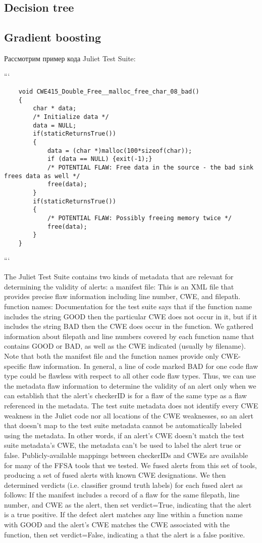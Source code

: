 \subsection{Decision tree}
\subsection{Gradient boosting}

Рассмотрим пример кода Juliet Test Suite:

```
\begin{verbatim}
    void CWE415_Double_Free__malloc_free_char_08_bad()
    {
        char * data;
        /* Initialize data */
        data = NULL;
        if(staticReturnsTrue())
        {
            data = (char *)malloc(100*sizeof(char));
            if (data == NULL) {exit(-1);}
            /* POTENTIAL FLAW: Free data in the source - the bad sink frees data as well */
            free(data);
        }
        if(staticReturnsTrue())
        {
            /* POTENTIAL FLAW: Possibly freeing memory twice */
            free(data);
        }
    }
\end{verbatim}
```


The Juliet Test Suite contains two kinds of metadata that
are relevant for determining the validity of alerts:
a manifest file: This is an XML file that provides precise
flaw information including line number, CWE, and
filepath.
function names: Documentation for the test suite says
that if the function name includes the string GOOD then
the particular CWE does not occur in it, but if it includes
the string BAD then the CWE does occur in the function.
We gathered information about filepath and line numbers
covered by each function name that contains GOOD or
BAD, as well as the CWE indicated (usually by filename).
Note that both the manifest file and the function names
provide only CWE-specific flaw information. In general, a line
of code marked BAD for one code flaw type could be flawless
with respect to all other code flaw types. Thus, we can use the
metadata flaw information to determine the validity of an alert
only when we can establish that the alert’s checkerID is for a
flaw of the same type as a flaw referenced in the metadata. The
test suite metadata does not identify every CWE weakness in
the Juliet code nor all locations of the CWE weaknesses, so
an alert that doesn’t map to the test suite metadata cannot be
automatically labeled using the metadata. In other words, if
an alert’s CWE doesn’t match the test suite metadata’s CWE,
the metadata can’t be used to label the alert true or false.
Publicly-available mappings between checkerIDs and
CWEs are available for many of the FFSA tools that we tested.
We fused alerts from this set of tools, producing a set of fused
alerts with known CWE designations. We then determined
verdicts (i.e. classifier ground truth labels) for each fused alert
as follows:
If the manifest includes a record of a flaw for the
same filepath, line number, and CWE as the alert, then
set verdict=True, indicating that the alert is a true
positive.
If the defect alert matches any line within a function
name with GOOD and the alert’s CWE matches the CWE
associated with the function, then set verdict=False,
indicating a that the alert is a false positive.


\newpage